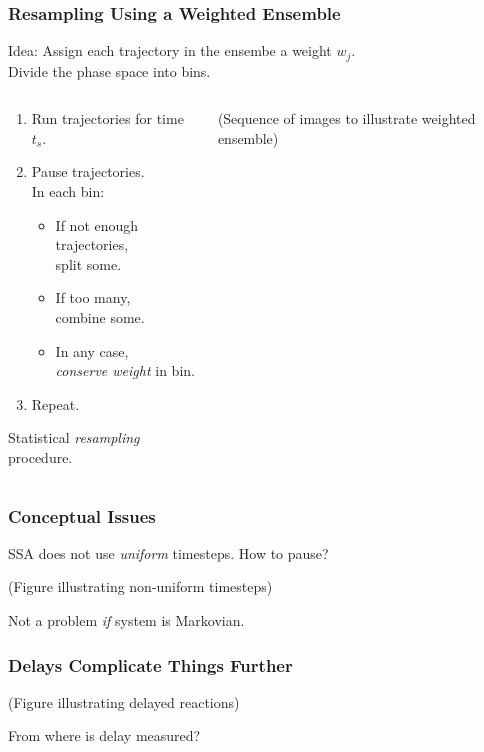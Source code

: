 \documentclass[xcolor={usenames,dvipsnames,svgnames}]{beamer}
\begin{document}
\begin{frame}
    \frametitle{Resampling Using a Weighted Ensemble}
    Idea: Assign each trajectory in the ensembe a weight $w_j$.\\
    Divide the phase space into bins.
    \begin{columns}[c]
        \begin{column}{0.5\textwidth}
            \begin{enumerate}
                \item Run trajectories for time $t_s$.
                \item Pause trajectories.\\
                    In each bin:
                \pause
                \begin{itemize}
                    \item If not enough trajectories,\\
                        split some.
                    \pause
                    \item If too many,\\
                        combine some.
                    \pause
                    \item In any case,\\
                        \emph{conserve weight} in bin.
                \end{itemize}
                \pause
                \item Repeat.
            \end{enumerate}
            \pause
            Statistical \emph{resampling} procedure.
        \end{column}
        \begin{column}{0.5\textwidth}
            (Sequence of images to illustrate weighted ensemble)
        \end{column}
    \end{columns}
\end{frame}

\begin{frame}
    \frametitle{Conceptual Issues}
    SSA does not use \emph{uniform} timesteps. How to pause?

    (Figure illustrating non-uniform timesteps)

    Not a problem \emph{if} system is Markovian.
\end{frame}

\begin{frame}
    \frametitle{Delays Complicate Things Further}
    (Figure illustrating delayed reactions)

    From where is delay measured?
\end{frame}
\end{document}
